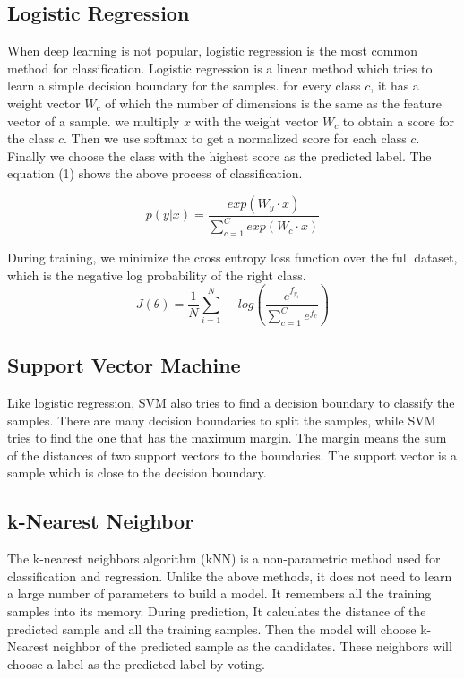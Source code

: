 \documentclass[sigchi]{acmart}
\begin{document}
\subsection{Logistic Regression}
When deep learning is not popular, logistic regression is the most common method for classification.  Logistic regression is a linear method which tries to learn a simple decision boundary for the samples. for every class $c$, it has a weight vector $W_c$ of which the number of dimensions is the same as the feature vector of a sample. we multiply $x$ with the weight vector $W_c$ to obtain a score for the class $c$. Then we use softmax to get a normalized score for each class $c$. Finally we choose the class with the highest score as the predicted label. The equation (1) shows the above process of classification.

\begin{equation}
  p(y|x) = \frac{exp(W_y\cdot x)}{\sum_{c=1}^C exp(W_c \cdot x)}
\end{equation}

During training, we minimize the cross entropy loss function over the full dataset, which is the negative log probability of the right class. 
\begin{equation}
  J(\theta) = \frac{1}{N} \sum_{i=1}^N -log(\frac{e^{f_{y_i}}}{\sum_{c=1}^C e^{f_c}} )
\end{equation}

\subsection{Support Vector Machine}
Like logistic regression, SVM also tries to find a decision boundary to classify the samples. There are many decision boundaries to split the samples, while SVM tries to find the one that has the maximum margin. The margin means the sum of the distances of two support vectors to the boundaries. The support vector is a sample which is close to the decision boundary.


\subsection{k-Nearest Neighbor}
The k-nearest neighbors algorithm (kNN) is a non-parametric method used for classification and regression. Unlike the above methods, it does not need to learn a large number of parameters to build a model. It remembers all the training samples into its memory. During prediction, It calculates the distance of the predicted sample and all the training samples. Then the model will choose k-Nearest neighbor of the predicted sample as the candidates. These neighbors will choose a label as the predicted label by voting.
\end{document}

